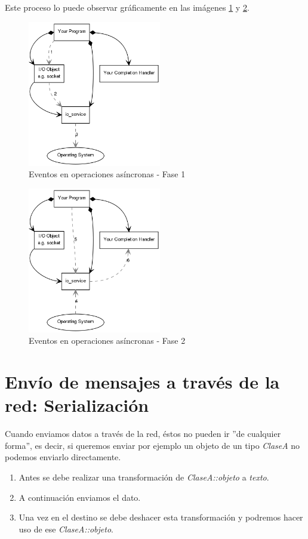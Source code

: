 \documentclass[a4paper,11pt,titlepage,halfparskip,cleardoubleempty]{scrbook}
\begin{document}
Este proceso lo puede observar gráficamente en las imágenes  \ref{img:sec1} y \ref{img:sec2}.


  \begin{figure}[h!]

  \centering
     \includegraphics[width=165pt]{img/async_op1.png}
    \caption{Eventos en operaciones asíncronas - Fase 1}
\label{img:sec1}
  \end{figure}





  \begin{figure}[h!]
  \centering
     \includegraphics[width=165pt]{img/async_op2.png}
    \caption{Eventos en operaciones asíncronas - Fase 2}
\label{img:sec2}
  \end{figure}




\section{Envío de mensajes a través de la red: Serialización}

Cuando enviamos datos a través de la red, éstos no pueden ir ''de cualquier forma'', es decir, si queremos enviar por ejemplo un objeto de un tipo  \textit{ClaseA} no podemos enviarlo directamente.
\begin{enumerate}
\item Antes se debe realizar una transformación de  \textit{ClaseA::objeto} a  \textit{texto}.
\item A continuación enviamos el dato.
\item Una vez en el destino se debe deshacer esta transformación y podremos hacer uso de ese  \textit{ClaseA::objeto}.
\end{enumerate}
\end{document}
